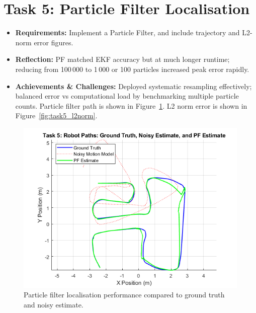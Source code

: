 \documentclass[conference]{IEEEtran}
\begin{document}
\section{Task 5: Particle Filter Localisation} 
\begin{itemize}
  \item \textbf{Requirements:} Implement a Particle Filter, and include trajectory and L2-norm error figures.
  \item \textbf{Reflection:} PF matched EKF accuracy but at much longer runtime; reducing from 100\,000 to 1\,000 or 100 particles increased peak error rapidly.
  \item \textbf{Achievements \& Challenges:} Deployed systematic resampling effectively; balanced error vs computational load by benchmarking multiple particle counts. Particle filter path is shown in Figure~\ref{fig:task5_paths}. L2 norm error is shown in Figure~\ref{fig:task5_l2norm}.
\end{itemize}

\begin{figure}[ht]
  \centering
  \includegraphics[width=\linewidth]{images/Task5_Paths_100kp.png}
  \caption{Particle filter localisation performance compared to ground truth and noisy estimate.}
  \label{fig:task5_paths}
\end{figure}
\end{document}
